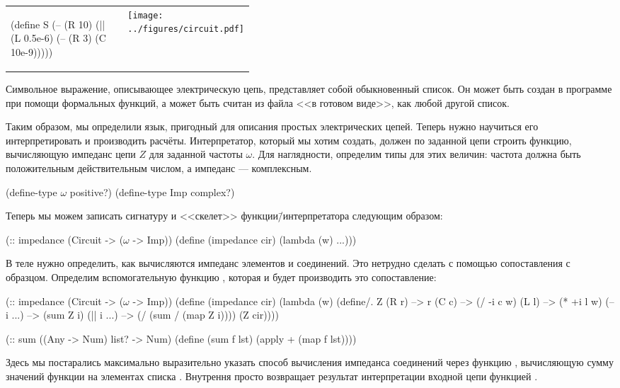 \medskip
\begin{tabular}{lm{0.4\linewidth}}%
\label{S}
\begin{SchemeCode}
(define S
  (-- (R 10)
      (|| (L 0.5e-6)
          (-- (R 3)
              (C 10e-9)))))
\end{SchemeCode}
&
\texttt{[image: ../figures/circuit.pdf]}
\end{tabular}
\vspace{-\medskipamount}
Символьное выражение, описывающее электрическую цепь, представляет собой обыкновенный список. Он может быть создан в программе при помощи формальных функций, а может быть считан из файла <<в готовом виде>>, как любой другой список.

Таким образом, мы определили язык, пригодный для описания простых электрических цепей. Теперь нужно научиться его интерпретировать и производить расчёты. Интерпретатор, который мы хотим создать, должен по заданной цепи строить функцию, вычисляющую импеданс цепи $Z$ для заданной частоты $\omega$. 
Для наглядности, определим типы для этих величин: частота должна быть положительным действительным числом, а импеданс --- комплексным.
\begin{Definition}
 (define-type $\omega$ positive?)
 (define-type Imp complex?)
\end{Definition}
Теперь мы можем записать сигнатуру и <<скелет>> функции\=/интерпретатора  следующим образом:
\label{example:impedance}%
\begin{SchemeCode}[emph={cir,w}]
(:: impedance (Circuit -> ($\omega$ -> Imp))
 (define (impedance cir)
   (lambda (w) ...)))
\end{SchemeCode}

В теле  нужно определить, как вычисляются импеданс элементов и соединений. Это нетрудно сделать с помощью сопоставления с образцом. Определим вспомогательную функцию , которая и будет производить это сопоставление:
\begin{Definition}[emph={cir,w}]
(:: impedance (Circuit -> ($\omega$ -> Imp))
 (define (impedance cir)
   (lambda (w) 
     (define/. Z
       (R r) --> r
       (C c) --> (/ -i c w)
       (L l) --> (* +i l w)
       (-- i ...) --> (sum Z i)
       (|| i ...) --> (/ (sum / (map Z i))))
     (Z cir))))

(:: sum ((Any -> Num) list? -> Num)
  (define (sum f lst) 
    (apply + (map f lst))))
\end{Definition}
Здесь мы постарались максимально выразительно указать способ вычисления импеданса соединений через функцию , вычисляющую сумму значений функции  на элементах списка . Внутрення   просто возвращает результат интерпретации входной цепи  функцией .

